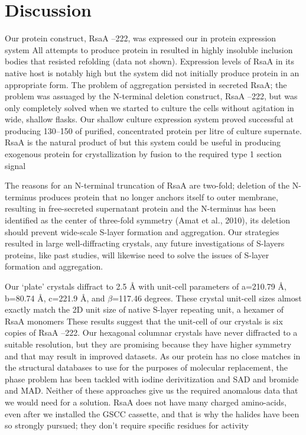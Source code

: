 \section{Discussion}\label{sec:crystal-discussion}
Our protein construct, RsaA --222, was expressed our in \caulobacter protein expression system All attempts to produce protein in \ecoli{} resulted in highly insoluble inclusion bodies that resisted refolding (data not shown). Expression levels of RsaA in its native host is notably high but the system did not initially produce protein in an appropriate form. The problem of aggregation persisted in \caulobacter secreted RsaA; the problem was assuaged by the N-terminal deletion construct, RsaA --222, but was only completely solved when we started to culture the cells without agitation in wide, shallow flasks. Our shallow culture expression system proved successful at producing 130--150 \milligram  of purified, concentrated protein per litre of culture supernate. RsaA is the natural product of \caulobacter but this system could be useful in producing exogenous protein for crystallization by fusion to the required type 1 section signal

The reasons for an N-terminal truncation of RsaA are two-fold; deletion of the N-terminus produces protein that no longer anchors itself to outer membrane, resulting in free-secreted supernatant protein and the N-terminus has been identified as the center of three-fold symmetry (Amat et al., 2010), its deletion should prevent wide-scale \ac{S-layer} formation and aggregation. Our strategies resulted in large well-diffracting crystals, any future investigations of \acp{S-layer} proteins, like past studies, will likewise need to solve the issues of \ac{S-layer} formation and aggregation.

Our `plate' crystals diffract to 2.5 \AA{} with unit-cell parameters of  a=210.79 \AA, b=80.74 \AA, c=221.9 \AA,  and $\beta$=117.46 degrees. These crystal unit-cell sizes almost exactly match the 2D unit size of native \ac{S-layer} repeating unit, a hexamer of RsaA monomers These results suggest that the unit-cell of our crystals is six copies of RsaA --222. Our hexagonal columnar crystals have never diffracted to a suitable resolution, but they are promising because they have higher symmetry and that may result in improved datasets. As our protein has no close matches in the structural databases to use for the purposes of molecular replacement, the phase problem has been tackled with iodine derivitization and \ac{SAD} and bromide and \ac{MAD}. Neither of these approaches give us the required anomalous data that we would need for a solution. RsaA does not have many charged amino-acids, even after we installed the GSCC cassette, and that is why the halides have been so strongly pursued; they don't require specific residues for activity

